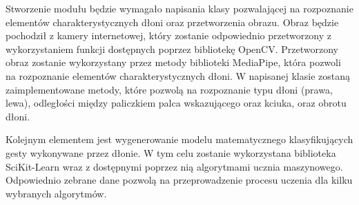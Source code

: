 \quad Stworzenie modułu będzie wymagało napisania klasy pozwalającej na rozpoznanie elementów charakterystycznych dłoni oraz przetworzenia obrazu. Obraz będzie pochodził z kamery internetowej, który zostanie odpowiednio przetworzony z wykorzystaniem funkcji dostępnych poprzez bibliotekę OpenCV. Przetworzony obraz zostanie wykorzystany przez metody biblioteki MediaPipe, która pozwoli na rozpoznanie elementów charakterystycznych dłoni. W napisanej klasie zostaną zaimplementowane metody, które pozwolą na rozpoznanie typu dłoni (prawa, lewa), odległości między paliczkiem palca wskazującego oraz kciuka, oraz obrotu dłoni. 

\quad Kolejnym elementem jest wygenerowanie modelu matematycznego klasyfikujących gesty wykonywane przez dłonie. W tym celu zostanie wykorzystana biblioteka SciKit-Learn wraz z dostępnymi poprzez nią algorytmami ucznia maszynowego. Odpowiednio zebrane dane pozwolą na przeprowadzenie procesu uczenia dla kilku wybranych algorytmów. 





